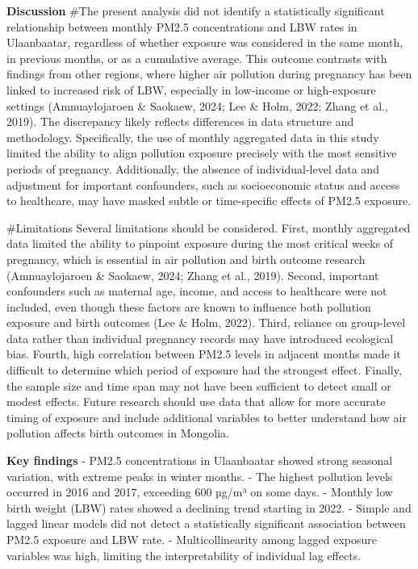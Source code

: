 \documentclass[
]{article}
\begin{document}
\textbf{Discussion} \#The present analysis did not identify a
statistically significant relationship between monthly PM2.5
concentrations and LBW rates in Ulaanbaatar, regardless of whether
exposure was considered in the same month, in previous months, or as a
cumulative average. This outcome contrasts with findings from other
regions, where higher air pollution during pregnancy has been linked to
increased risk of LBW, especially in low-income or high-exposure
settings (Amnuaylojaroen \& Saokaew, 2024; Lee \& Holm, 2022; Zhang et
al., 2019). The discrepancy likely reflects differences in data
structure and methodology. Specifically, the use of monthly aggregated
data in this study limited the ability to align pollution exposure
precisely with the most sensitive periods of pregnancy. Additionally,
the absence of individual-level data and adjustment for important
confounders, such as socioeconomic status and access to healthcare, may
have masked subtle or time-specific effects of PM2.5 exposure.

\#Limitations Several limitations should be considered. First, monthly
aggregated data limited the ability to pinpoint exposure during the most
critical weeks of pregnancy, which is essential in air pollution and
birth outcome research (Amnuaylojaroen \& Saokaew, 2024; Zhang et al.,
2019). Second, important confounders such as maternal age, income, and
access to healthcare were not included, even though these factors are
known to influence both pollution exposure and birth outcomes (Lee \&
Holm, 2022). Third, reliance on group-level data rather than individual
pregnancy records may have introduced ecological bias. Fourth, high
correlation between PM2.5 levels in adjacent months made it difficult to
determine which period of exposure had the strongest effect. Finally,
the sample size and time span may not have been sufficient to detect
small or modest effects. Future research should use data that allow for
more accurate timing of exposure and include additional variables to
better understand how air pollution affects birth outcomes in Mongolia.

\textbf{Key findings} - PM2.5 concentrations in Ulaanbaatar showed
strong seasonal variation, with extreme peaks in winter months. - The
highest pollution levels occurred in 2016 and 2017, exceeding 600 µg/m³
on some days. - Monthly low birth weight (LBW) rates showed a declining
trend starting in 2022. - Simple and lagged linear models did not detect
a statistically significant association between PM2.5 exposure and LBW
rate. - Multicollinearity among lagged exposure variables was high,
limiting the interpretability of individual lag effects.
\end{document}
